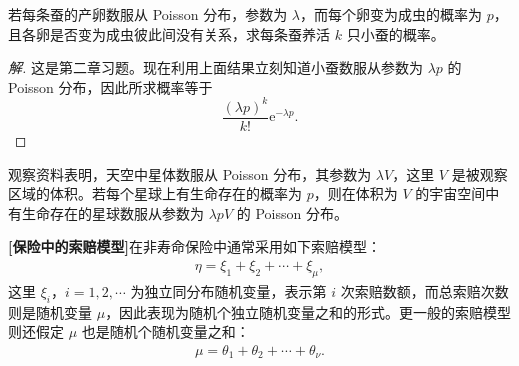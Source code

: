 \documentclass[../../main.tex]{subfiles}
\begin{document}
\begin{example}[蚕产卵]\label{example:ch04-蚕产卵}
若每条蚕的产卵数服从 Poisson 分布，参数为 $\lambda$，而每个卵变为成虫的概率为 $p$，且各卵是否变为成虫彼此间没有关系，求每条蚕养活 $k$ 只小蚕的概率。
\end{example}

\begin{proof}[解]
这是第二章习题。现在利用上面结果立刻知道小蚕数服从参数为 $\lambda p$ 的 Poisson 分布，因此所求概率等于
\[
\frac{(\lambda p)^k}{k!}\mathrm{e}^{-\lambda p}.
\]
\end{proof}

\begin{example}[星体数]\label{example:ch04-星体数}
观察资料表明，天空中星体数服从 Poisson 分布，其参数为 $\lambda V$，这里 $V$ 是被观察区域的体积。若每个星球上有生命存在的概率为 $p$，则在体积为 $V$ 的宇宙空间中有生命存在的星球数服从参数为 $\lambda p V$ 的 Poisson 分布。
\end{example}

\textbf{[保险中的索赔模型]}\quad 在非寿命保险中通常采用如下索赔模型：
\begin{align}
\eta=\xi_1+\xi_2+\cdots+\xi_\mu,\label{align:ch04-索赔模型}
\end{align}
这里 $\xi_i$，$i=1,2,\cdots$ 为独立同分布随机变量，表示第 $i$ 次索赔数额，而总索赔次数则是随机变量 $\mu$，因此表现为随机个独立随机变量之和的形式。更一般的索赔模型则还假定 $\mu$ 也是随机个随机变量之和：
\begin{align}
\mu=\theta_1+\theta_2+\cdots+\theta_\nu.\label{align:ch04-索赔次数模型}
\end{align}
\end{document}
